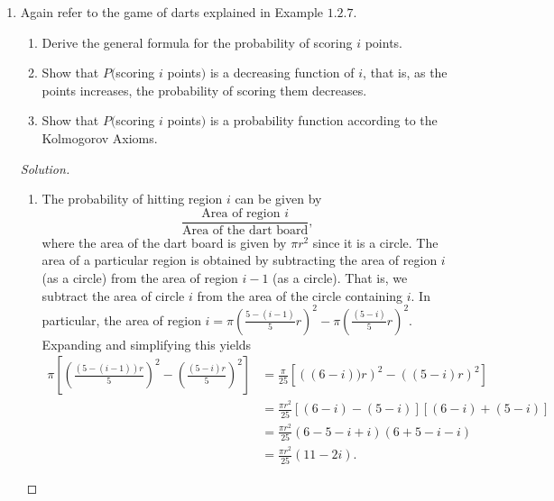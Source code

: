 \documentclass[12pt]{article}
\theoremstyle{definition}
\theoremstyle{plain}
\newenvironment{solution}
  {\begin{proof}[Solution]}
  {\end{proof}}
\begin{document}
\begin{enumerate}
\begin{solution}
\begin{enumerate}
	\item The event we consider is $ A \cup B $. This is because if $ x \in A \cup B $ then $ x $ resides in at least $ A $ or $ B $ or both. The solution is the same as part $ (a) $.
	 
	\item If at most one of $ A $ or $ B $ occurs, it follows that $ A $ and $ B $ do not occur simultaneously. That is, the event we consider is $ (A \cap B)^c  $. The probability is given as $ P((A \cap B)^c) = 1 - P(A \cap B) $.
	\end{enumerate}
	\end{solution}
	
\setcounter{enumi}{7}
\item Again refer to the game of darts explained in Example $ 1.2.7 $.
	\begin{enumerate}
	\item Derive the general formula for the probability of scoring $ i $ points.
	\item Show that $ P( $scoring $ i $ points$ ) $ is a decreasing function of $ i $, that is, as the points increases, the probability of scoring them decreases.
	\item Show that $ P( $scoring $ i $ points$ ) $ is a probability function according to the Kolmogorov Axioms.
	\end{enumerate}
	
	\begin{solution}
	\begin{enumerate}
	\item The probability of hitting region $ i $ can be given by 
		\[ \frac{\text{Area of region } i}{\text{Area of the dart board}}, \]
		where the area of the dart board is given by $ \pi r^2 $ since it is a circle. The area of a particular region is obtained by subtracting the area of region $ i $ (as a circle) from the area of region $ i - 1 $ (as a circle). That is, we subtract the area of circle $ i $ from the area of the circle containing $ i $. In particular, the area of region $ i = \pi (\frac{5 - (i - 1)}{5} r)^2 - \pi (\frac{(5 - i)}{5} r)^2 $. Expanding and simplifying this yields
		\begin{align*}
			\pi \left [ \left (\frac{(5 - (i-1)) r}{5} \right)^2 - \left ( \frac{(5 - i)r}{5} \right )^2 \right] &= \frac{\pi}{25}\left[ \left ( (6 - i))r \right)^2 - \left( (5 - i)r \right)^2 \right] \\
			&= \frac{\pi r^2}{25} \left [ (6 - i) - (5 - i) \right] \left[ (6 - i) + (5 - i) \right]\\
			&= \frac{\pi r^2}{25} (6 - 5 - i + i)(6 + 5 - i - i)\\
			&= \frac{\pi r^2}{25} (11 - 2i).
		\end{align*}
		

\end{enumerate}
\end{solution}
\end{enumerate}
\end{document}
